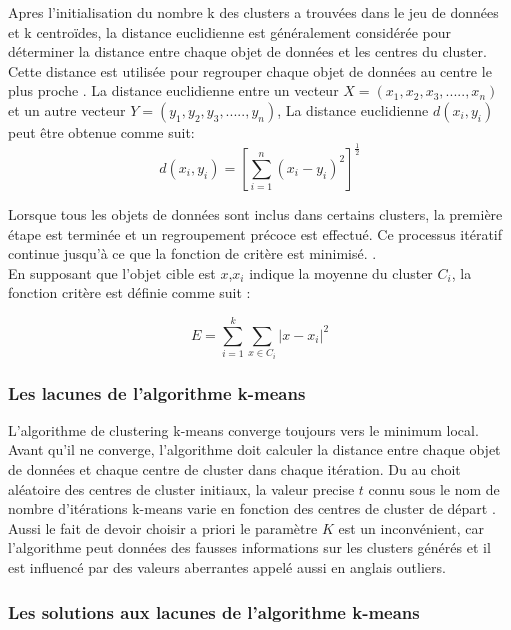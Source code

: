 Apres l’initialisation du nombre k des clusters a trouvées dans le jeu de données et k centroïdes, la distance euclidienne est généralement considérée pour déterminer la distance entre chaque objet de données et les centres du cluster. Cette distance est utilisée pour regrouper chaque objet de données au centre le plus proche \cite{fahim2006efficient}. La distance euclidienne entre un vecteur \(\displaystyle X = (x_{1},x_{2},x_{3},.....,x_{n}) \)  et un autre vecteur \(\displaystyle Y = (y_{1},y_{2},y_{3},.....,y_{n}) \), La distance euclidienne \(\displaystyle d(x_{i},y_{i})\) peut être obtenue comme suit:
\begin{equation}
    d(x_{i}, y_{i}) = \left[\sum_{i=1}^{n}(x_{i} - y_{i})^{2} \right]^{\frac{1}{2}}
\end{equation}

Lorsque tous les objets de données sont inclus dans certains clusters, la première étape est terminée et un regroupement précoce est effectué. Ce processus itératif continue jusqu'à ce que la fonction de critère est minimisé. \cite{na2010research}. \\
En supposant que l'objet cible est \(\displaystyle x \),\(\displaystyle x_{i} \) indique la moyenne du cluster \(\displaystyle C_{i} \), la fonction critère est définie comme suit :

\begin{equation}
    E = \sum_{i=1}^{k} \sum_{x \in C_{i}} \left\lvert x - x_{i} \right\rvert^{2}
\end{equation}

\subsubsection{Les lacunes de l’algorithme k-means}
L'algorithme de clustering k-means converge toujours vers le minimum local. Avant qu’il ne converge, l'algorithme doit calculer la distance entre chaque objet de données et chaque centre de cluster dans chaque itération. Du au choit aléatoire des centres de cluster initiaux, la valeur precise \(\displaystyle t \) connu sous le nom de nombre d'itérations k-means varie en fonction des centres de cluster de départ \cite{nazeer2009improving}. Aussi le fait de devoir choisir a priori le paramètre \(\displaystyle K \) est un inconvénient, car l’algorithme peut données des fausses informations sur les clusters générés et il est influencé par des valeurs aberrantes appelé aussi en anglais outliers.

\subsubsection{Les solutions aux lacunes de l’algorithme k-means}

